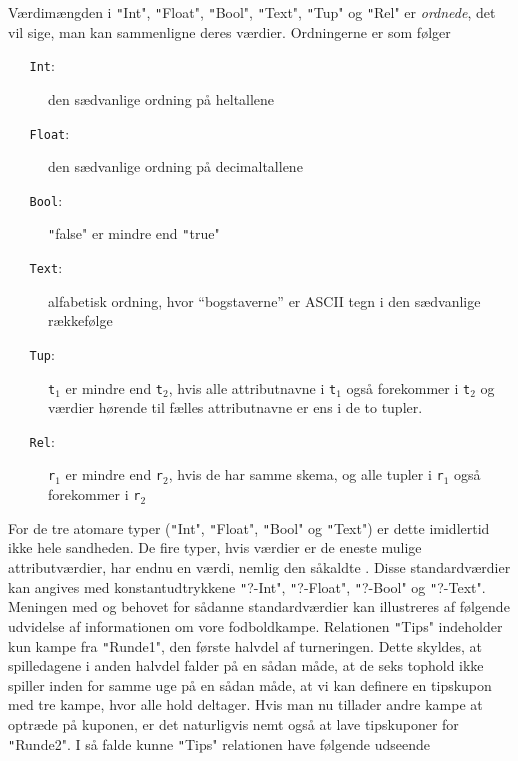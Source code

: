 \documentclass{article}
\newcounter{eks}
\begin{document}
V\ae{}rdim\ae{}ngden i \texttt"Int", \texttt"Float", \texttt"Bool", \texttt"Text", \texttt"Tup" og
\texttt"Rel" er {\em ordnede}, det vil sige, man kan sammenligne deres
v\ae{}rdier. Ordningerne er som f\o{}lger
\begin{description}%
\item[{\tt ~~~Int}:] den s\ae{}dvanlige ordning p\aa{} heltallene
\item[{\tt ~~~Float}:] den s\ae{}dvanlige ordning p\aa{} decimaltallene
\item[{\tt ~~~Bool}:] \texttt"false" er mindre end \texttt"true"
\item[{\tt ~~~Text}:] alfabetisk ordning, hvor ``bogstaverne'' er ASCII tegn
i den s\ae{}dvanlige r\ae{}kkef\o{}lge
\item[{\tt ~~~Tup}:] {\tt t$_1$} er mindre end {\tt t$_2$}, hvis alle attributnavne
i {\tt t$_1$} ogs\aa{} forekommer i {\tt t$_2$} og v\ae{}rdier h\o{}rende
til f\ae{}lles attributnavne er ens i de to tupler. 
\item[{\tt ~~~Rel}:] {\tt r$_1$} er mindre end {\tt r$_2$}, hvis 
de har samme skema, og alle tupler i {\tt r$_1$} ogs\aa{} 
forekommer i {\tt r$_2$}
\end{description}
For de tre atomare typer (\texttt"Int", \texttt"Float", \texttt"Bool" og \texttt"Text")
er dette imidlertid ikke hele sandheden. De fire typer, hvis
v\ae{}rdier er de eneste mulige attributv\ae{}rdier, har endnu en v\ae{}rdi,
nemlig den s\aa{}kaldte {\em {}}. Disse 
standardv\ae{}rdier kan angives
med konstantudtrykkene \texttt"?-Int", \texttt"?-Float", \texttt"?-Bool" og \texttt"?-Text".
Meningen med og behovet for s\aa{}danne standardv\ae{}rdier kan
illustreres af f\o{}lgende udvidelse af informationen om vore
fodboldkampe. Relationen
\texttt"Tips" indeholder kun kampe fra \texttt"Runde1", den f\o{}rste halvdel af 
turneringen. Dette skyldes, at spilledagene i anden halvdel falder
p\aa{} en s\aa{}dan m\aa{}de, at de seks tophold ikke spiller
inden for samme uge p\aa{} en s\aa{}dan m\aa{}de, at vi kan
definere en tipskupon med tre kampe, hvor alle hold deltager.
Hvis man nu tillader andre kampe at optr\ae{}de p\aa{} kuponen, er det
naturligvis nemt ogs\aa{} at lave tipskuponer for \texttt"Runde2".
I s\aa{} falde kunne \texttt"Tips" relationen have f\o{}lgende udseende
\end{document}
